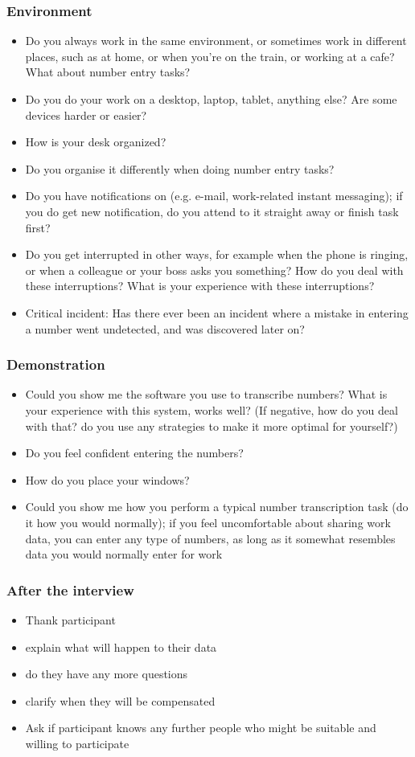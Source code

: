 \subsubsection{Environment}
\begin{itemize}
\item Do you always work in the same environment, or sometimes work in different places, such as at home, or when you're on the train, or working at a cafe? What about number entry tasks?
\item Do you do your work on a desktop, laptop, tablet, anything else? Are some devices harder or easier?
\item How is your desk organized?
\item Do you organise it differently when doing number entry tasks?
\item Do you have notifications on (e.g. e-mail, work-related instant messaging); if you do get new notification, do you attend to it straight away or finish task first?
\item Do you get interrupted in other ways, for example when the phone is ringing, or when a colleague or your boss asks you something? How do you deal with these interruptions? What is your experience with these interruptions?
\item Critical incident: Has there ever been an incident where a mistake in entering a number went undetected, and was discovered later on?
\end{itemize}

\subsubsection{Demonstration}
\begin{itemize}
\item Could you show me the software you use to transcribe numbers?
What is your experience with this system, works well?
(If negative, how do you deal with that? do you use any strategies to make it more optimal for yourself?)
\item Do you feel confident entering the numbers?
\item How do you place your windows?
\item Could you show me how you perform a typical number transcription task (do it how you would normally); if you feel uncomfortable about sharing work data, you can enter any type of numbers, as long as it somewhat resembles data you would normally enter for work
\end{itemize}
\subsubsection{After the interview}
\begin{itemize}
\item Thank participant
\item explain what will happen to their data
\item do they have any more questions
\item clarify when they will be compensated
\item Ask if participant knows any further people who might be suitable and willing to participate
\end{itemize}

